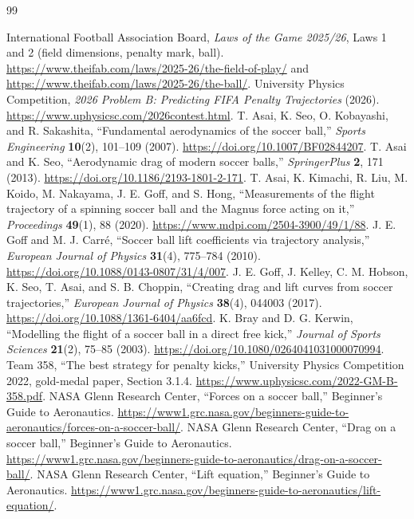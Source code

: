 \begin{thebibliography}{99}


 International Football Association Board, \emph{Laws of the Game 2025/26}, Laws 1 and 2 (field dimensions, penalty mark, ball). \url{https://www.theifab.com/laws/2025-26/the-field-of-play/} and \url{https://www.theifab.com/laws/2025-26/the-ball/}.
 University Physics Competition, \emph{2026 Problem B: Predicting FIFA Penalty Trajectories} (2026). \url{https://www.uphysicsc.com/2026contest.html}.
 T. Asai, K. Seo, O. Kobayashi, and R. Sakashita, “Fundamental aerodynamics of the soccer ball,” \emph{Sports Engineering} \textbf{10}(2), 101--109 (2007). \url{https://doi.org/10.1007/BF02844207}.
 T. Asai and K. Seo, “Aerodynamic drag of modern soccer balls,” \emph{SpringerPlus} \textbf{2}, 171 (2013). \url{https://doi.org/10.1186/2193-1801-2-171}.
 T. Asai, K. Kimachi, R. Liu, M. Koido, M. Nakayama, J. E. Goff, and S. Hong, “Measurements of the flight trajectory of a spinning soccer ball and the Magnus force acting on it,” \emph{Proceedings} \textbf{49}(1), 88 (2020). \url{https://www.mdpi.com/2504-3900/49/1/88}.
 J. E. Goff and M. J. Carr\'e, “Soccer ball lift coefficients via trajectory analysis,” \emph{European Journal of Physics} \textbf{31}(4), 775--784 (2010). \url{https://doi.org/10.1088/0143-0807/31/4/007}.
 J. E. Goff, J. Kelley, C. M. Hobson, K. Seo, T. Asai, and S. B. Choppin, “Creating drag and lift curves from soccer trajectories,” \emph{European Journal of Physics} \textbf{38}(4), 044003 (2017). \url{https://doi.org/10.1088/1361-6404/aa6fcd}.
 K. Bray and D. G. Kerwin, “Modelling the flight of a soccer ball in a direct free kick,” \emph{Journal of Sports Sciences} \textbf{21}(2), 75--85 (2003). \url{https://doi.org/10.1080/0264041031000070994}.
 Team 358, “The best strategy for penalty kicks,” University Physics Competition 2022, gold-medal paper, Section 3.1.4. \url{https://www.uphysicsc.com/2022-GM-B-358.pdf}.
 NASA Glenn Research Center, “Forces on a soccer ball,” Beginner's Guide to Aeronautics. \url{https://www1.grc.nasa.gov/beginners-guide-to-aeronautics/forces-on-a-soccer-ball/}.
 NASA Glenn Research Center, “Drag on a soccer ball,” Beginner's Guide to Aeronautics. \url{https://www1.grc.nasa.gov/beginners-guide-to-aeronautics/drag-on-a-soccer-ball/}.
 NASA Glenn Research Center, “Lift equation,” Beginner's Guide to Aeronautics. \url{https://www1.grc.nasa.gov/beginners-guide-to-aeronautics/lift-equation/}.

\end{thebibliography}
